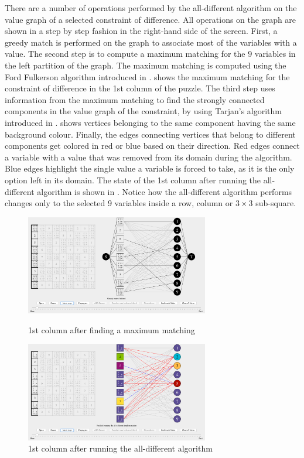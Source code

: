 \documentclass{l4proj}
\begin{document}
\noindent There are a number of operations performed by the all-different algorithm on the value graph of a selected constraint of difference. All operations on the graph are shown in a step by step fashion in the right-hand side of the screen. First, a greedy match is performed on the graph to associate most of the variables with a value. The second step is to compute a maximum matching for the $9$ variables in the left partition of the graph. The maximum matching is computed using the Ford Fulkerson algorithm  \cite{ford1956maximal} introduced in .  shows the maximum matching for the constraint of difference in the 1st column of the puzzle. The third step uses information from the maximum matching to find the strongly connected components in the value graph of the constraint, by using Tarjan's algorithm \cite{tarjan1972depth} introduced in .  shows vertices belonging to the same component having the same background colour. Finally, the edges connecting vertices that belong to different components get colored in red or blue based on their direction. Red edges connect a variable with a value that was removed from its domain during the algorithm. Blue edges highlight the single value a variable is forced to take, as it is the only option left in its domain. The state of the 1st column after running the all-different algorithm is shown in . Notice how the all-different algorithm performs changes only to the selected 9 variables inside a row, column or $3\times 3$ sub-square.

\begin{figure}[H]
\begin{minipage}{8.0cm}
\centering
\includegraphics[width=8cm]{images/proof_of_concept/screenshot1.png}
\caption{1st column after finding a maximum matching}
\label{screenshot1}
\end{minipage}%
\hfill
\begin{minipage}{8.0cm}
\centering
\includegraphics[width=8cm]{images/proof_of_concept/screenshot2.png}
\caption{1st column after running the all-different algorithm}
\label{screenshot2}
\end{minipage}%
\end{figure}
\end{document}

